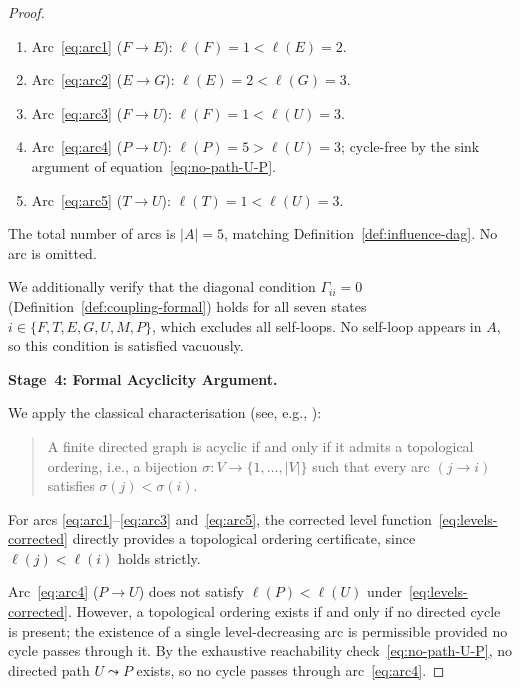 \documentclass[12pt,openany]{book}
\newcommand{\calE}{\mathcal{E}}
\newcommand{\calF}{\mathcal{F}}
\newcommand{\calG}{\mathcal{G}}
\newcommand{\calP}{\mathcal{P}}
\newcommand{\calU}{\mathcal{U}}
\newcommand{\calM}{\mathcal{M}}
\newcommand{\calT}{\mathcal{T}}
\numberwithin{equation}{chapter}
\theoremstyle{plain}
\theoremstyle{definition}
\theoremstyle{remark}
\def\mathcal#1{#1}%
\begin{document}
\begin{proof}
\begin{enumerate}
  \item Arc~\eqref{eq:arc1} ($\calF \to \calE$):
        $\ell(\calF)=1 < \ell(\calE)=2$.  \checkmark
  \item Arc~\eqref{eq:arc2} ($\calE \to \calG$):
        $\ell(\calE)=2 < \ell(\calG)=3$.  \checkmark
  \item Arc~\eqref{eq:arc3} ($\calF \to \calU$):
        $\ell(\calF)=1 < \ell(\calU)=3$.  \checkmark
  \item Arc~\eqref{eq:arc4} ($\calP \to \calU$):
        $\ell(\calP)=5 > \ell(\calU)=3$; cycle-free by
        the sink argument of
        equation~\eqref{eq:no-path-U-P}.  \checkmark
  \item Arc~\eqref{eq:arc5} ($\calT \to \calU$):
        $\ell(\calT)=1 < \ell(\calU)=3$.  \checkmark
\end{enumerate}
The total number of arcs is $|\mathcal{A}|=5$, matching
Definition~\ref{def:influence-dag}.  No arc is omitted.

We additionally verify that the diagonal condition
$\Gamma_{ii}=0$ (Definition~\ref{def:coupling-formal}) holds
for all seven states
$i \in \{\calF,\calT,\calE,\calG,\calU,\calM,\calP\}$,
which excludes all self-loops.  No self-loop appears in
$\mathcal{A}$, so this condition is satisfied vacuously.
\checkmark

\medskip
\noindent\textbf{Stage~4: Formal Acyclicity Argument.}

\noindent
We apply the classical characterisation
(see, e.g., \cite[Thm.~22.12]{CormenEtAl2009}):

\begin{quote}
  A finite directed graph is acyclic if and only if it admits
  a topological ordering, i.e., a bijection
  $\sigma: V \to \{1,\dots,|V|\}$ such that every arc
  $(j \to i)$ satisfies $\sigma(j) < \sigma(i)$.
\end{quote}

\noindent
For arcs \eqref{eq:arc1}--\eqref{eq:arc3}
and~\eqref{eq:arc5}, the corrected level
function~\eqref{eq:levels-corrected} directly provides a
topological ordering certificate, since
$\ell(j) < \ell(i)$ holds strictly.

Arc~\eqref{eq:arc4} ($\calP \to \calU$) does not satisfy
$\ell(\calP) < \ell(\calU)$ under~\eqref{eq:levels-corrected}.
However, a topological ordering exists if and only if no
directed cycle is present; the existence of a single
level-decreasing arc is permissible provided no cycle passes
through it.  By the exhaustive reachability
check~\eqref{eq:no-path-U-P}, no directed path
$\calU \leadsto \calP$ exists, so no cycle passes through
arc~\eqref{eq:arc4}.


\end{proof}
\end{document}
